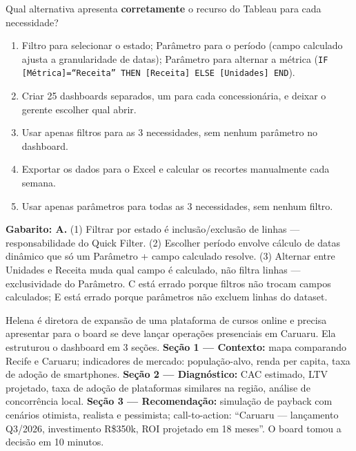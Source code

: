 \begin{SolvedBox}[title=Questão 3 --- Prova II Unidade (2{,}0 pts) --- Tableau: Filtros e Parâmetros]
Qual alternativa apresenta \textbf{corretamente} o recurso do Tableau para cada necessidade?
\begin{enumerate}[label=\Alph*)]
  \item Filtro para selecionar o estado; Parâmetro para o período (campo calculado ajusta a granularidade de datas); Parâmetro para alternar a métrica (\texttt{IF [Métrica]=``Receita'' THEN [Receita] ELSE [Unidades] END}).
  \item Criar 25 dashboards separados, um para cada concessionária, e deixar o gerente escolher qual abrir.
  \item Usar apenas filtros para as 3 necessidades, sem nenhum parâmetro no dashboard.
  \item Exportar os dados para o Excel e calcular os recortes manualmente cada semana.
  \item Usar apenas parâmetros para todas as 3 necessidades, sem nenhum filtro.
\end{enumerate}
\end{SolvedBox}

\textbf{Gabarito: A.} (1) Filtrar por estado é inclusão/exclusão de linhas --- responsabilidade do Quick Filter. (2) Escolher período envolve cálculo de datas dinâmico que só um Parâmetro + campo calculado resolve. (3) Alternar entre Unidades e Receita muda qual campo é calculado, não filtra linhas --- exclusividade do Parâmetro. C está errado porque filtros não trocam campos calculados; E está errado porque parâmetros não excluem linhas do dataset.

\medskip

Helena é diretora de expansão de uma plataforma de cursos online e precisa apresentar para o board se deve lançar operações presenciais em Caruaru. Ela estruturou o dashboard em 3 seções. \textbf{Seção 1 --- Contexto:} mapa comparando Recife e Caruaru; indicadores de mercado: população-alvo, renda per capita, taxa de adoção de smartphones. \textbf{Seção 2 --- Diagnóstico:} CAC estimado, LTV projetado, taxa de adoção de plataformas similares na região, análise de concorrência local. \textbf{Seção 3 --- Recomendação:} simulação de payback com cenários otimista, realista e pessimista; call-to-action: ``Caruaru --- lançamento Q3/2026, investimento R\$350k, ROI projetado em 18 meses''. O board tomou a decisão em 10 minutos.

